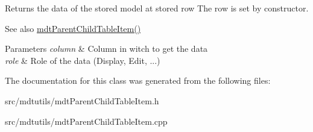 Returns the data of the stored model at stored row The row is set by constructor. 

\begin{DoxySeeAlso}{See also}
\hyperlink{classmdt_parent_child_table_item_ad1a5c00ca1d0367d631548fa5732d41c}{mdtParentChildTableItem()} 
\end{DoxySeeAlso}

\begin{DoxyParams}{Parameters}
{\em column} & Column in witch to get the data \\
\hline
{\em role} & Role of the data (Display, Edit, ...) \\
\hline
\end{DoxyParams}


The documentation for this class was generated from the following files:\begin{DoxyCompactItemize}
\item 
src/mdtutils/mdtParentChildTableItem.h\item 
src/mdtutils/mdtParentChildTableItem.cpp\end{DoxyCompactItemize}
